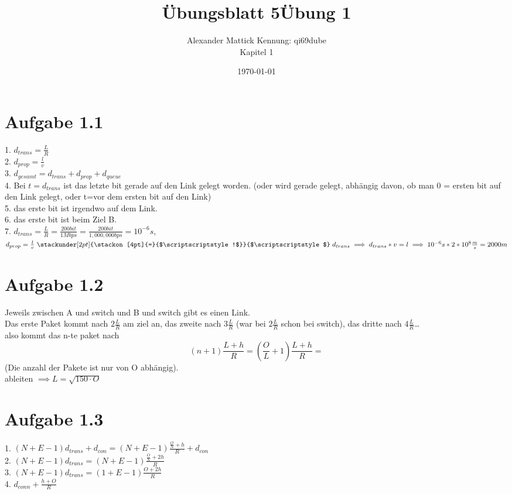 \documentclass{article}
\title{Übungsblatt 5}
\author{
Alexander Mattick Kennung: qi69dube\\
Kapitel 1
}
\date{\today}
\title{Übung 1}
\newcommand\stackequal[2]{%
  \mathrel{\stackunder[2pt]{\stackon[4pt]{=}{$\scriptscriptstyle#1$}}{%
  $\scriptscriptstyle#2$}}
 }
\begin{document}
	\maketitle
	\section{Aufgabe 1.1}
	1. $d_{trans} = \frac{L}{R}$\\
	2. $d_{prop} = \frac{l}{v}$\\
	3. $d_{gesamt} = d_{trans}+d_{prop}+d_{queue}$\\
	4. Bei $t=d_{trans}$ ist das letzte bit gerade auf den Link gelegt worden. (oder wird gerade gelegt, abhängig davon, ob man 0 = ersten bit auf den Link gelegt, oder t=vor dem ersten bit auf den Link)\\
	5. das erste bit ist irgendwo auf dem Link.\\
	6. das erste bit ist beim Ziel B.\\
	7. $d_{trans} = \frac{L}{R} = \frac{200bit}{1Mbps} = \frac{200bit}{1,000,000bps} = 10^{-6} s$, $d_{prop} = \frac{l}{v}\stackequal{!}{}d_{trans}\implies d_{trans}*v = l \implies 10^{-6} s* 2*10^8\frac{m}{s} = 2000m$\\
	\section{Aufgabe 1.2}
	Jeweils zwischen A und switch und B und switch gibt es einen Link.\\
	Das erste Paket kommt nach $2\frac{L}{R}$ am ziel an, das zweite nach $3\frac{L}{R}$ (war bei $2\frac{L}{R}$ schon bei switch), das dritte nach $4\frac{L}{R}$\dots\\
	also kommt das n-te paket nach
	\[(n+1)\frac{L+h}{R} = (\frac{O}{L}+1)\frac{L+h}{R} = \]
	(Die anzahl der Pakete ist nur von O abhängig).\\
	ableiten $\implies L=\sqrt{150\cdot O}$
	\section{Aufgabe 1.3}
	1. $(N+E-1)d_{trans}+d_{con} = (N+E-1)\frac{\frac{O}{N}+h}{R}+d_{con}$\\
	2. $(N+E-1)d_{trans} = (N+E-1)\frac{\frac{O}{N}+2h}{R}$\\
	3. $(N+E-1)d_{trans} = (1+E-1)\frac{O+2h}{R}$\\
	4. $d_{conn}+\frac{h+O}{R}$
\end{document}

